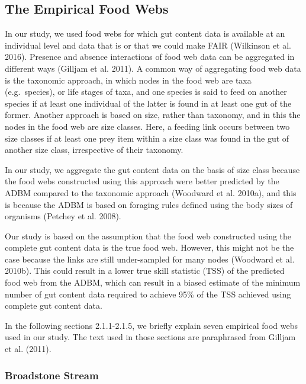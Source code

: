 \documentclass{article}
\begin{document}
\hypertarget{the-empirical-food-webs}{%
\subsection{The Empirical Food Webs}\label{the-empirical-food-webs}}

In our study, we used food webs for which gut content data is available
at an individual level and data that is or that we could make FAIR
(Wilkinson et al. 2016). Presence and absence interactions of food web
data can be aggregated in different ways (Gilljam et al. 2011). A common
way of aggregating food web data is the taxonomic approach, in which
nodes in the food web are taxa (e.g.~species), or life stages of taxa,
and one species is said to feed on another species if at least one
individual of the latter is found in at least one gut of the former.
Another approach is based on size, rather than taxonomy, and in this the
nodes in the food web are size classes. Here, a feeding link occurs
between two size classes if at least one prey item within a size class
was found in the gut of another size class, irrespective of their
taxonomy.

In our study, we aggregate the gut content data on the basis of size
class because the food webs constructed using this approach were better
predicted by the ADBM compared to the taxonomic approach (Woodward et
al. 2010a), and this is because the ADBM is based on foraging rules
defined using the body sizes of organisms (Petchey et al. 2008).

Our study is based on the assumption that the food web constructed using
the complete gut content data is the true food web. However, this might
not be the case because the links are still under-sampled for many nodes
(Woodward et al. 2010b). This could result in a lower true skill
statistic (TSS) of the predicted food web from the ADBM, which can
result in a biased estimate of the minimum number of gut content data
required to achieve 95\% of the TSS achieved using complete gut content
data.

In the following sections 2.1.1-2.1.5, we briefly explain seven
empirical food webs used in our study. The text used in those sections
are paraphrased from Gilljam et al. (2011).

\hypertarget{broadstone-stream}{%
\subsubsection{Broadstone Stream}\label{broadstone-stream}}
\end{document}
